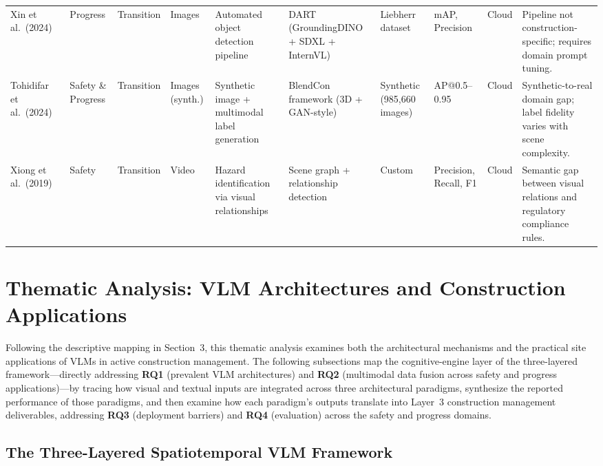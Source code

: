 \documentclass[10pt,letterpaper]{article}
\begin{document}
\begin{landscape}
\begin{longtable}{L{2.8cm} L{1.7cm} L{2.0cm} L{2.5cm} L{1.5cm} L{3.0cm} L{1.8cm} L{2.0cm} L{2.0cm} L{3.2cm}}
Xin et al.\ (2024)~\cite{xin2024} & Progress & Transition & Images & Automated object detection pipeline & DART (GroundingDINO + SDXL + InternVL) & Liebherr dataset & mAP, Precision & Cloud & Pipeline not construction-specific; requires domain prompt tuning.\\

Tohidifar et al.\ (2024)~\cite{tohidifar2024} & Safety \& Progress & Transition & Images (synth.) & Synthetic image + multimodal label generation & BlendCon framework (3D + GAN-style) & Synthetic (985,660 images) & AP@0.5--0.95 & Cloud & Synthetic-to-real domain gap; label fidelity varies with scene complexity.\\

Xiong et al.\ (2019) & Safety & Transition & Video & Hazard identification via visual relationships & Scene graph + relationship detection & Custom & Precision, Recall, F1 & Cloud & Semantic gap between visual relations and regulatory compliance rules.\\

\end{longtable}
\end{landscape}

\section{Thematic Analysis: VLM Architectures and Construction Applications}

Following the descriptive mapping in Section~3, this thematic analysis examines both the architectural mechanisms and the practical site applications of VLMs in active construction management. The following subsections map the cognitive-engine layer of the three-layered framework---directly addressing \textbf{RQ1} (prevalent VLM architectures) and \textbf{RQ2} (multimodal data fusion across safety and progress applications)---by tracing how visual and textual inputs are integrated across three architectural paradigms, synthesize the reported performance of those paradigms, and then examine how each paradigm's outputs translate into Layer~3 construction management deliverables, addressing \textbf{RQ3} (deployment barriers) and \textbf{RQ4} (evaluation) across the safety and progress domains.

\subsection{The Three-Layered Spatiotemporal VLM Framework}
\end{document}
